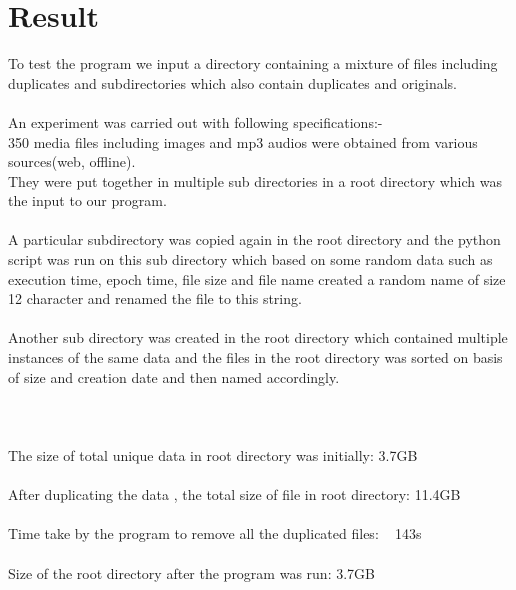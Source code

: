 \chapter{Result}

To test the program we input a directory containing a mixture of files including duplicates and subdirectories which also contain duplicates and originals.\\~\\
An experiment was carried out with following specifications:-
\\350 media files including images and mp3 audios were obtained from various sources(web, offline). 
\\They were put together in multiple sub directories in a root directory which was the input to our program. 
\\~\\A particular subdirectory was copied again in the root directory and the python script was run on this sub directory which based on some random data such as execution time, epoch time, file size and file name created a random name of size 12 character and renamed the file to this string. 
\\~\\Another sub directory was created in the root directory which contained multiple instances of the same data and the files in the root directory was sorted on basis of size and creation date and then named accordingly.
\\~\\
\\~\\The size of total unique data in root directory was initially: 3.7GB
\\~\\After duplicating the data , the total size of file in root directory: 11.4GB
\\~\\Time take by the program to remove all the duplicated files: ~ 143s
\\~\\Size of the root directory after the program was run: 3.7GB
